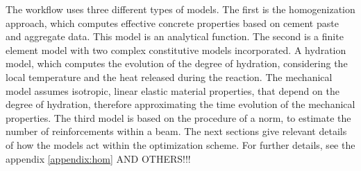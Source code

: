 The workflow uses three different types of models.
The first is the homogenization approach, which computes effective concrete properties based on cement paste and aggregate data.
This model is an analytical function.
The second is a finite element model with two complex constitutive models incorporated.
A hydration model, which computes the evolution of the degree of hydration, considering the local temperature and the heat released during the reaction.
The mechanical model assumes isotropic, linear elastic material properties, that depend on the degree of hydration, therefore approximating the time evolution of the mechanical properties.
The third model is based on the procedure of a norm, to estimate the number of reinforcements within a beam.
The next sections give relevant details of how the models act within the optimization scheme.
For further details, see the appendix \ref{appendix:hom} AND OTHERS!!!